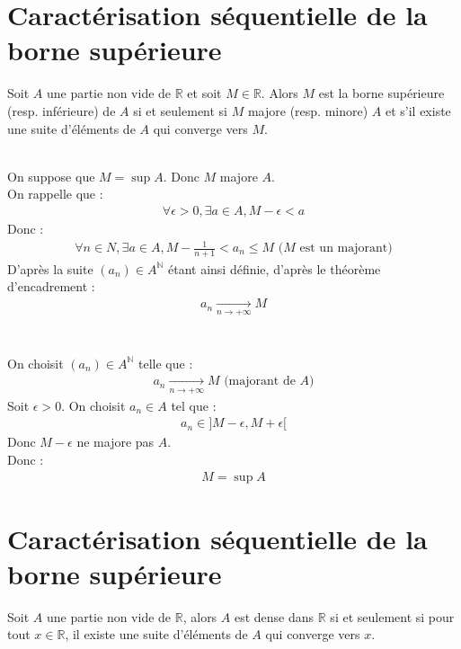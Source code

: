 \documentclass[../main.tex]{subfiles}
\begin{document}
\section{Caractérisation séquentielle de la borne supérieure}
\begin{tcolorbox}[title=Théorème 14.41, title filled=false, colframe=orange, colback=orange!10!white]
    Soit $A$ une partie non vide de $\mathbb{R}$ et soit $M \in \mathbb{R}$. Alors $M$ est la borne supérieure (resp. inférieure) de $A$ si et seulement si $M$ majore (resp. minore) $A$ et s'il existe une suite d'éléments de $A$ qui converge vers $M$. 
\end{tcolorbox}

\boxed{\Rightarrow} \\
On suppose que $M = \sup A$. Donc $M$ majore $A$. \\
On rappelle que : 
\begin{align*}
    \forall \epsilon > 0, \exists a \in A, M - \epsilon < a
\end{align*}
Donc : 
\begin{align*}
    \forall n \in N, \exists a \in A, M - \frac{1}{n+1} < a_n \leq M \text{ ($M$ est un majorant)}
\end{align*}
D'après la suite $(a_n) \in A^{\mathbb{N}}$ étant ainsi définie, d'après le théorème d'encadrement : 
\begin{align*}
    \boxed{a_n \underset{n \to +\infty}{\longrightarrow} M}
\end{align*} \\

\boxed{\Leftarrow} \\
On choisit $(a_n) \in A^{\mathbb{N}}$ telle que : 
\begin{align*}
    a_n \underset{n \to +\infty}{\longrightarrow} M \text{ (majorant de $A$)}
\end{align*}
Soit $\epsilon > 0$. On choisit $a_n \in A$ tel que : 
\begin{align*}
    a_n \in ]M-\epsilon, M+\epsilon[
\end{align*}
Donc $M - \epsilon$ ne majore pas $A$. \\
Donc : 
\begin{align*}
    \boxed{M = \sup A}
\end{align*}

\section{Caractérisation séquentielle de la borne supérieure}
\begin{tcolorbox}[title=Théorème 14.42, title filled=false, colframe=orange, colback=orange!10!white]
    Soit $A$ une partie non vide de $\mathbb{R}$, alors $A$ est dense dans $\mathbb{R}$ si et seulement si pour tout $x \in \mathbb{R}$, il existe une suite d'éléments de $A$ qui converge vers $x$. 
\end{tcolorbox}
\end{document}
